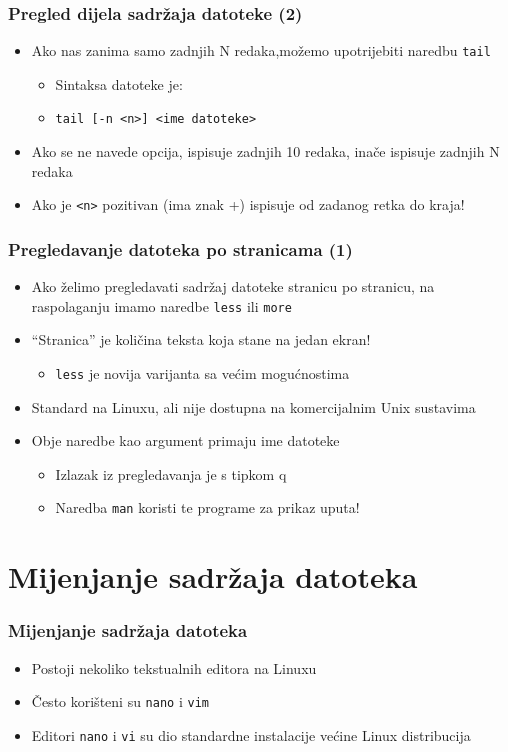 \documentclass{beamer}
\newcommand{\shell}[1]{\texttt{\small #1}}
\begin{document}
\begin{frame}[t]
\frametitle{Pregled dijela sadržaja datoteke (2)}
\begin{itemize}
  \item Ako nas zanima samo zadnjih N redaka,možemo upotrijebiti
        naredbu \shell{tail}
  \begin{itemize}
    \item Sintaksa datoteke je:
    \item[] \shell{tail [-n <n>] <ime datoteke>}
  \end{itemize}
  \item Ako se ne navede opcija, ispisuje zadnjih 10 redaka, inače ispisuje
        zadnjih N redaka
  \item Ako je \shell{<n>} pozitivan (ima znak +) ispisuje od zadanog
        retka do kraja!
\end{itemize}
\end{frame}

\begin{frame}[t]
\frametitle{Pregledavanje datoteka po stranicama (1)}
\begin{itemize}
  \item Ako želimo pregledavati sadržaj datoteke stranicu po stranicu, na
        raspolaganju imamo naredbe \shell{less} ili \shell{more}
  \item ``Stranica'' je količina teksta koja stane na jedan ekran!
  \begin{itemize}
    \item \shell{less} je novija varijanta sa većim mogućnostima
  \end{itemize}
  \item Standard na Linuxu, ali nije dostupna na komercijalnim Unix
        sustavima
  \item Obje naredbe kao argument primaju ime datoteke
  \begin{itemize}
    \item Izlazak iz pregledavanja je s tipkom q
    \item Naredba \shell{man} koristi te programe za prikaz uputa!
  \end{itemize}
\end{itemize}
\end{frame}

\section{Mijenjanje sadržaja datoteka}
\begin{frame}[t]
\frametitle{Mijenjanje sadržaja datoteka}
\begin{itemize}
  \item Postoji nekoliko tekstualnih editora na Linuxu
  \item Često korišteni su \shell{nano} i \shell{vim}
  \item Editori \shell{nano} i \shell{vi} su dio standardne instalacije većine Linux distribucija
\end{itemize}
\end{frame}
\end{document}
